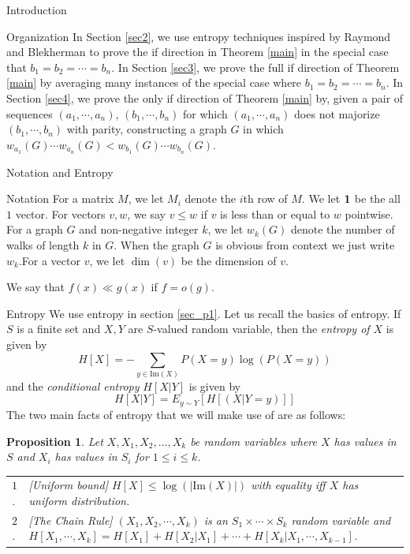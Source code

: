 \documentclass[11pt,a4paper]{article}
\newtheorem{proposition}{Proposition}
\newcommand{\im}{\mathrm{Im}}
\begin{document}
\begin{section}{Introduction}
\begin{subsection}{Organization} In Section \ref{sec2}, we use entropy techniques inspired by Raymond and Blekherman \cite{BR} to prove the if direction in Theorem \ref{main} in the special case that $b_1 = b_2 = \cdots = b_n$. In Section \ref{sec3}, we prove the full if direction of Theorem \ref{main} by averaging many instances of the special case where $b_1 = b_2 = \cdots = b_n$. In Section \ref{sec4}, we prove the only if direction of Theorem \ref{main} by, given a pair of sequences $(a_1, \cdots, a_n)$, $(b_1, \cdots, b_n)$ for which $(a_1, \cdots, a_n)$ does not majorize $(b_1, \cdots, b_n)$ with parity, constructing a graph $G$ in which $w_{a_1}(G) \cdots w_{a_n}(G) < w_{b_1}(G) \cdots w_{b_n}(G)$. 

\end{subsection}
\begin{section}{Notation and Entropy} \label{sec2}

\begin{subsection}{Notation}
For a matrix $M$, we let $M_i$ denote the $i$th row of $M$. We let $\bf{1}$ be the all $1$ vector. For vectors $v, w$, we say $v \leq w$ if $v$ is less than or equal to $w$ pointwise. For a graph $G$ and non-negative integer $k$, we let $w_k(G)$ denote the number of walks of length $k$ in $G$. When the graph $G$ is obvious from context we just write $w_k$.For a vector $v$, we let $\dim(v)$ be the dimension of $v$. 

\medskip

We say that $f(x) \ll g(x)$ if $f = o(g)$. 
\end{subsection}
\begin{subsection}{Entropy} We use entropy in section \ref{sec_p1}. Let us recall the basics of entropy.
If $S$ is a finite set and $X, Y$ are $S$-valued random variable, then the {\em entropy of $X$} is given by
\[
	H[X] = -\sum_{y \in \im(X)} P(X = y) \log ( P(X = y) )
\]
and the {\em conditional entropy} $H[X | Y]$ is given by
\[
	H[X | Y] = E_{y \sim Y} [ H[(X | Y = y)]]
\]
The two main facts of entropy that we will make use of are as follows:
\begin{proposition}
Let $X,X_1,X_2,\dots,X_k$ be random variables where $X$ has values in $S$ and $X_i$ has values in $S_i$ for $1 \leq i \leq k$.
\begin{center}
\begin{tabular}{lp{5in}}
$1$. & {\rm [Uniform bound]} $H[X] \leq \log( |\im(X)| )$ with equality iff $X$ has uniform distribution.\\
$2$. & {\rm [The Chain Rule]} $(X_1,X_2, \cdots, X_k)$ is an $S_1 \times \cdots \times S_k$ random variable and $H[X_1, \cdots, X_k] = H[X_1] + H[X_2 | X_1] + \cdots + H[X_k | X_1, \cdots, X_{k - 1} ]$.
\end{tabular}
\end{center}
\end{proposition}
\end{subsection}
\end{section}
\end{section}
\end{document}
